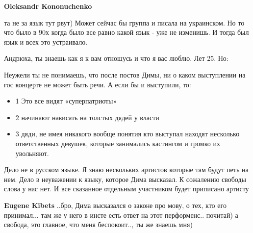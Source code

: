 \begin{itemize}
\begin{itemize}
\textbf{Oleksandr Kononuchenko} 

та не за язык тут рвут) Может сейчас бы группа
и писала на украинском. Но то что было в 90х когда было все равно какой язык -
уже не изменишь. И тогда был язык и всех это устраивало.

\end{itemize}

 

Андрюха, ты знаешь как я к вам отношусь и что я вас люблю. Лет 25. Но:

Неужели ты не понимаешь, что после постов Димы, ни о каком выступлении на гос концерте не может быть речи. А если бы и выступили, то:

\begin{itemize}
  \item 1 Это все видят «суперпатриоты»
  \item 2 начинают нависать на толстых дядей у власти
	\item 3 дяди, не имея никакого вообще понятия кто выступал находят несколько
	ответственных девушек, которые занимались кастингом и громко их увольняют.
\end{itemize}

Дело не в русском языке. Я знаю нескольких артистов которые там будут петь на
нем. Дело в неуважении к языку, которое Дима высказал. К сожалению свободы
слова у нас нет. И все сказанное отдельным участником будет приписано артисту

\begin{itemize}
 
\textbf{Eugene Kibets} ..бро, Дима высказался о законе про мову, о тех, кто его принимал... там же у него в инсте есть ответ на этот перформенс.. почитай) а свобода, это главное, что меня беспокоит.., ты же знаешь мня)

 

\end{itemize}
\end{itemize}
